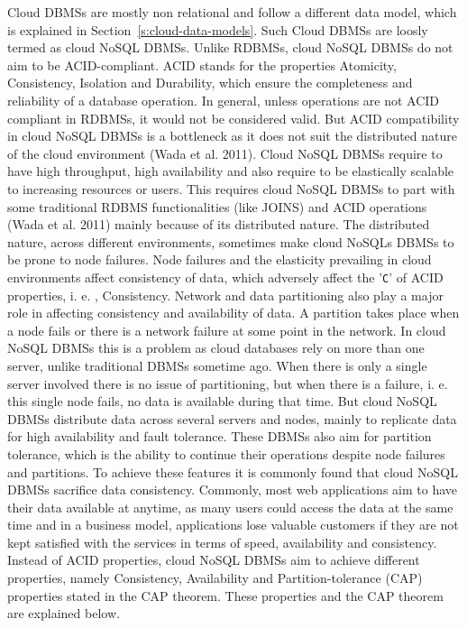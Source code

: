 Cloud \acp{DBMS} are mostly non relational and follow a different data model,  
which is explained in Section~\ref{s:cloud-data-models}.  Such Cloud \acp{DBMS}
are loosly termed as cloud \ac{NoSQL} \acp{DBMS}.  Unlike \acp{RDBMS},   cloud
\ac{NoSQL} \acp{DBMS} do not aim to be ACID-compliant. 
ACID stands for the properties Atomicity,   Consistency,   Isolation and Durability,  
which ensure the completeness and reliability of a database operation.  In
general,   unless operations are not ACID compliant in \acp{RDBMS},   it would not
be considered valid. 
But ACID compatibility in cloud \ac{NoSQL} \acp{DBMS} is a bottleneck as it does
not suit the distributed nature of the cloud environment (Wada et al.  2011). 
Cloud \ac{NoSQL} \acp{DBMS} require to have high throughput,   high availability
and also require to be elastically scalable to increasing resources or users. 
This requires cloud \ac{NoSQL} \acp{DBMS} to part with some traditional
\ac{RDBMS} functionalities (like JOINS) and ACID operations (Wada et al.  2011)
mainly because of its distributed nature.  The distributed nature,   across
different environments,   sometimes make cloud \acp{NoSQL} \acp{DBMS} to be prone
to node failures.  Node failures and the elasticity prevailing in cloud
environments affect consistency of data,   which adversely affect the '\texttt{C}'
of ACID properties,   i. e. ,   Consistency.  Network and data partitioning also play a
major role in affecting consistency and availability of data.   A partition takes
place when a node fails or there is a network failure at some point in the
network.  In cloud \ac{NoSQL} \acp{DBMS} this is a problem as cloud databases
rely on more than one server,   unlike traditional \acp{DBMS} sometime ago.  When
there is only a single server involved there is no issue of partitioning,   but
when there is a failure,   i. e.  this single node fails,   no data is available
during that time.  But cloud \ac{NoSQL} \acp{DBMS} distribute data across several
servers and nodes,   mainly to replicate data for high availability and fault
tolerance. 
These \acp{DBMS} also aim for partition tolerance,   which is the ability to
continue their operations despite node failures and partitions.  To achieve these
features it is commonly found that cloud \ac{NoSQL} \acp{DBMS} sacrifice data
consistency.  Commonly,   most web applications aim to have their data available at
anytime,   as many users could access the data at the same time and in a business
model,   applications lose valuable customers if they are not kept satisfied with
the services in terms of speed,   availability and consistency.  Instead of ACID
properties,   cloud \ac{NoSQL} \acp{DBMS} aim to achieve different
properties,   namely Consistency,   Availability and Partition-tolerance (CAP)
properties stated in the CAP theorem. 
These properties and the CAP theorem are explained below. 

